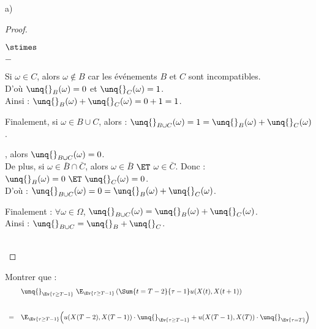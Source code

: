 \documentclass[11pt]{article}%
\begin{document}
\begin{noliste}{a)}
\begin{proof}
\begin{remark}
\begin{noliste}{$\stimes$}
\begin{liste}{$-$}
	    \item Si $\omega \in C$, alors $\omega \notin B$ car les
	    événements $B$ et $C$ sont incompatibles.\\
	    D'où $\unq{}_B(\omega)=0$ et $\unq{}_C(\omega)=1$.\\
	    Ainsi : $\unq{}_B(\omega) + \unq{}_C(\omega) = 0+1=1$.
	  \end{liste}
	  Finalement, si $\omega \in B \cup C$, alors :
	  $\unq{}_{B \cup C}(\omega) = 1 = \unq{}_B(\omega) + \unq{}_C
	  (\omega)$.
	  
	  \item {}, alors $\unq{}_{B \cup C}(\omega)
	  =0$.\\[.1cm]
	  De plus, si $\omega \in \bar{B} \cap \bar{C}$, alors 
	  $\omega \in \bar{B}$ $\ET$ $\omega \in \bar{C}$. Donc : 
	  $\unq{}_B(\omega)=0 \ \ET \ \unq{}_C(\omega)=0$.\\
	  D'où : $\unq{}_{B \cup C}(\omega)=0= \unq{}_B(\omega) + 
	  \unq{}_C(\omega)$.
        \end{noliste}
        Finalement : $\forall \omega \in \Omega$, $\unq{}_{B \cup C}
        (\omega) = \unq{}_B(\omega) + \unq{}_C(\omega)$.\\
        Ainsi : $\unq{}_{B \cup C} = \unq{}_B + \unq{}_C$.
      \end{remark}~\\[-1.4cm]
    \end{proof}
    
    \item Montrer que :
    \[
     \begin{array}{cl}
      & \unq{}_{\Ev{\tau \geq T-1}} \ \E_{\Ev{\tau \geq T-1}} 
      \left( \Sum{t=T-2}{\tau -1} u(X(t),X(t+1)\right) 
      \\[.8cm]
      = &
      \E_{\Ev{\tau \geq T-1}} \Big( u(X(T-2),X(T-1)) \cdot
      \unq{}_{\Ev{\tau \geq T-1}} + u(X(T-1),X(T)) \cdot 
      \unq{}_{\Ev{\tau = T}}\Big)
     \end{array}
    \]
    

\end{noliste}
\end{document}
